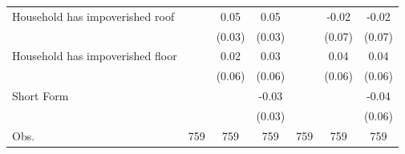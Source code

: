 {\begin{tabular}{l*{6}{c}}
Household has impoverished roof&                     &        0.05         &        0.05         &                     &       -0.02         &       -0.02         \\
                    &                     &      (0.03)         &      (0.03)         &                     &      (0.07)         &      (0.07)         \\
Household has impoverished floor&                     &        0.02         &        0.03         &                     &        0.04         &        0.04         \\
                    &                     &      (0.06)         &      (0.06)         &                     &      (0.06)         &      (0.06)         \\
Short Form          &                     &                     &       -0.03         &                     &                     &       -0.04         \\
                    &                     &                     &      (0.03)         &                     &                     &      (0.06)         \\
\hline
Obs.                &         759         &         759         &         759         &         759         &         759         &         759         \\
\hline\hline
\end{tabular}
}

